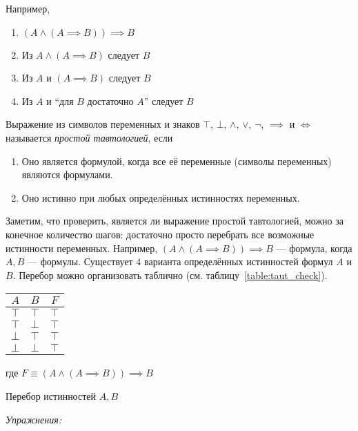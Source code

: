 Например,
\begin{enumerate}
	\item{}$(A\land (A\implies B))\implies B$
	\item{}Из $A\land (A\implies B)$ следует $B$
	\item{}Из $A$ и $(A\implies B)$ следует $B$
	\item{}Из $A$ и ``для $B$ достаточно $A$'' следует $B$
\end{enumerate}

\pagebreak

Выражение из символов переменных и знаков $\top$, $\bot$, $\land$, $\lor$, $\lnot$,
$\implies$ и $\iff$ называется {\it простой тавтологией}, если
\begin{multicols}{2}
	\begin{enumerate}
		\item{}Оно является формулой, когда все её переменные (символы переменных)
		являются формулами.
		\columnbreak
		\item{}Оно истинно при любых определённых истинностях переменных.
	\end{enumerate}
\end{multicols}

Заметим, что проверить, является ли выражение простой тавтологией,
можно за конечное количество шагов: достаточно просто перебрать все возможные истинности
переменных.
Например, ${(A\land (A\implies B))\implies B}$ --- формула, когда $A,B$ --- формулы.
Существует $4$ варианта определённых истинностей формул $A$ и $B$.
Перебор можно организовать таблично (см. таблицу~\ref{table:taut_check}).
\begin{margintable}
	\begin{tabular}{cc|c}
		$A$    & $B$    & $F$    \\\hline
		$\top$ & $\top$ & $\top$ \\
		$\top$ & $\bot$ & $\top$ \\
		$\bot$ & $\top$ & $\top$ \\
		$\bot$ & $\bot$ & $\top$
	\end{tabular}

	где $F\equiv{(A\land (A\implies B))\implies B}$

	\caption{Перебор истинностей $A,B$}\label{table:taut_check}
\end{margintable}

\vspace{1em}
{\it Упражнения:}

